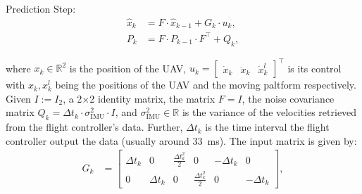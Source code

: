 \documentclass[conference, onecolumn, draftclsnofoot]{IEEEtran}
\begin{document}

Prediction Step:\begin{subequations}
\begin{align} 
\hat{x}_{k} & = F \cdot \hat{x}_{k-1} + G_{k} \cdot u_{k}, \\ 
P_{k} & = F \cdot P_{k-1} \cdot F^\top + Q_{k},
\end{align}\end{subequations}

where $x_k \in \mathbb{R}^2$ is the position of the UAV, $u_{k} = \begin{bmatrix}\dot{x}_k & \ddot{x}_k & \dot{x}_{k}^l\end{bmatrix}^\top$ is its control with $x_k,x_k^l$ being the positions of the UAV and the moving paltform respectively.
Given $I:=I_2$, a \SI{2}{}$\times$\SI{2}{} identity matrix, the matrix $F=I$, the noise covariance matrix $Q_k=\Delta t_k\cdot\sigma^2_{\textrm{IMU}}\cdot I$, and $\sigma^2_{\textrm{IMU}}\in\mathbb{R}$ is the variance of the velocities retrieved from the flight controller's data. Further, \(\Delta t_k\) is the time interval the flight controller output the data (usually around \SI{33}{\ms}). 
The input matrix is given by:
\begin{align*}
G_{k} & = \begin{bmatrix}
    \Delta t_k & 0 & \frac{\Delta t_k^{2}}{2} & 0 & -\Delta t_k & 0\\ 
    0 & \Delta t_k & 0 & \frac{\Delta t_k^{2}}{2} &0 & -\Delta t_k\end{bmatrix}, \\
\end{align*}
\end{document}
